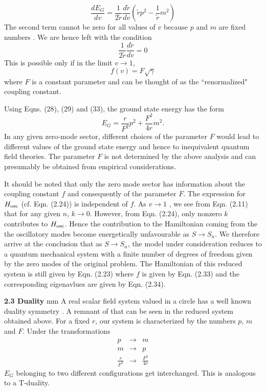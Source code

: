 \documentclass[a4paper,12pt]{article}
\begin{document}
\begin{equation}
\frac{dE_G}{dv}=\frac{1}{2{\tilde r}}\frac{d {\tilde r}}{dv}({\tilde r}p^2 
- \frac{1}{{\tilde r}}m^2)
\end{equation}
The second term cannot be zero for all values of
$v$ because $p$ and $m$ are fixed numbers . We are hence left with
the condition
\begin{equation}
\frac{1}{2{\tilde r}}\frac{d {\tilde r}}{dv}=0
\end{equation}
This is possible only if in the limit $v \rightarrow 1$, 
\begin{equation}
f(v)=F\sqrt{\gamma}
\end{equation}
where $F$ is a constant parameter and can be thought of as the
``renormalized" coupling constant.

Using Eqns. (28), (29) and (33), the ground state
 energy has the form
\begin{equation}
E_G=\frac{r}{F^2}p^2 + \frac{F^2}{4r}m^2.
\end{equation}
In any given zero-mode sector,
different choices of the parameter $F$ 
would lead to different values of the
ground state energy and hence to inequivalent quantum field theories. 
The parameter $F$ is not determined by the above analysis
 and can presumably
be obtained from empirical considerations.

It should be noted that only the zero mode sector has information about the
coupling constant $f$ and consequently of the parameter $F$. 
The expression for 
$H_{\rm osc}$ (cf. Eqn. (2.24)) is independent of $f$.
As  $v \rightarrow 1$ , we see from Eqn. (2.11) that for any given $n$,
$k \rightarrow 0$. However, from Eqn. (2.24), only nonzero $k$ contributes
to $H_{\rm{osc}}$. Hence the contribution to the Hamiltonian coming from the 
the oscillatory modes
become energetically unfavourable as $S \rightarrow S_n$.
We therefore arrive at the conclusion that as $S \rightarrow S_n$, the
model under consideration reduces to a  quantum mechanical system with a
finite number of degrees of freedom given by the zero modes of the
original problem. The
Hamiltonian of this reduced system is still given
 by Eqn. (2.23) where $f$ is given by Eqn. (2.33) and the corresponding
eigenavlues are given by Eqn. (2.34).

\vskip 5mm
\noindent
{\bf 2.3 Duality}
 mm
\noindent
A real scalar field system valued in a circle has a well known duality
symmetry \cite{dual}.
A remnant of that can be seen in  the reduced system obtained above.
For a fixed $r$, our system is characterized by the 
numbers $p$, $m$ and $F$.  Under the transformations
\begin{eqnarray}
p&{\longrightarrow}&m\nonumber\\
m&{\longrightarrow}&p\nonumber\\
\frac{r}{F^2}&{\longrightarrow}&\frac{F^2}{4 r}
\end{eqnarray}
$E_G$ belonging to two different configurations get interchanged. This is
analogous to a T-duality.
\end{document}
